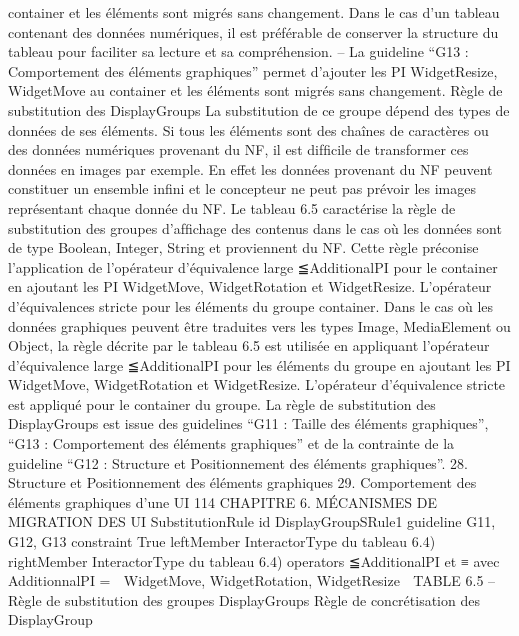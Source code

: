 \documentclass{article}
\begin{document}
container et les \'{e}l\'{e}ments sont migr\'{e}s sans changement. Dans le cas d’un tableau contenant
des donn\'{e}es num\'{e}riques, il est pr\'{e}f\'{e}rable de conserver la structure du tableau pour faciliter
sa lecture et sa compr\'{e}hension.
– La guideline “G13 : Comportement des \'{e}l\'{e}ments graphiques” permet d’ajouter les PI WidgetResize, WidgetMove au container et les \'{e}l\'{e}ments sont migr\'{e}s sans changement.
R\`{e}gle de substitution des DisplayGroups
La substitution de ce groupe d\'{e}pend des types de donn\'{e}es de ses \'{e}l\'{e}ments. Si tous les \'{e}l\'{e}ments sont des cha\^{i}nes de caract\`{e}res ou des donn\'{e}es num\'{e}riques
provenant du NF, il est difﬁcile de transformer ces donn\'{e}es en images par exemple. En effet les donn\'{e}es provenant du NF peuvent constituer un ensemble inﬁni et le concepteur ne peut pas pr\'{e}voir
les images repr\'{e}sentant chaque donn\'{e}e du NF. Le tableau 6.5 caract\'{e}rise la r\`{e}gle de substitution des
groupes d’afﬁchage des contenus dans le cas o\`{u} les donn\'{e}es sont de type Boolean, Integer, String et
proviennent du NF. Cette r\`{e}gle pr\'{e}conise l’application de l’op\'{e}rateur d’\'{e}quivalence large ≦AdditionalPI
pour le container en ajoutant les PI WidgetMove, WidgetRotation et WidgetResize. L’op\'{e}rateur d’\'{e}quivalences stricte pour les \'{e}l\'{e}ments du groupe container.
Dans le cas o\`{u} les donn\'{e}es graphiques peuvent \^{e}tre traduites vers les types Image, MediaElement
ou Object, la r\`{e}gle d\'{e}crite par le tableau 6.5 est utilis\'{e}e en appliquant l’op\'{e}rateur d’\'{e}quivalence large
≦AdditionalPI pour les \'{e}l\'{e}ments du groupe en ajoutant les PI WidgetMove, WidgetRotation et WidgetResize. L’op\'{e}rateur d’\'{e}quivalence stricte est appliqu\'{e} pour le container du groupe.
La r\`{e}gle de substitution des DisplayGroups est issue des guidelines “G11 : Taille des \'{e}l\'{e}ments
graphiques”, “G13 : Comportement des \'{e}l\'{e}ments graphiques” et de la contrainte de la guideline
“G12 : Structure et Positionnement des \'{e}l\'{e}ments graphiques”.
28. Structure et Positionnement des \'{e}l\'{e}ments graphiques
29. Comportement des \'{e}l\'{e}ments graphiques d’une UI
114
CHAPITRE 6. MÉCANISMES DE MIGRATION DES UI
SubstitutionRule
id
DisplayGroupSRule1
guideline
G11, G12, G13
constraint
True
leftMember
InteractorType du tableau 6.4)
rightMember
InteractorType du tableau 6.4)
operators
≦AdditionalPI et ≡
avec AdditionnalPI =
 WidgetMove, WidgetRotation,
WidgetResize

TABLE 6.5 – R\`{e}gle de substitution des groupes DisplayGroups
R\`{e}gle de concr\'{e}tisation des DisplayGroup
\end{document}
